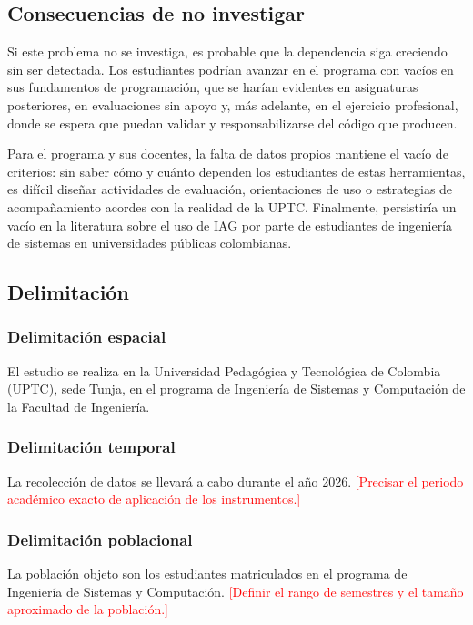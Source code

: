 \documentclass[12pt,letterpaper]{article}
\newcommand{\pendiente}[1]{\textcolor{red}{[#1]}}
\begin{document}
\subsection{Consecuencias de no investigar}

Si este problema no se investiga, es probable que la dependencia siga creciendo sin ser detectada. Los estudiantes podrían avanzar en el programa con vacíos en sus fundamentos de programación, que se harían evidentes en asignaturas posteriores, en evaluaciones sin apoyo y, más adelante, en el ejercicio profesional, donde se espera que puedan validar y responsabilizarse del código que producen.

Para el programa y sus docentes, la falta de datos propios mantiene el vacío de criterios: sin saber cómo y cuánto dependen los estudiantes de estas herramientas, es difícil diseñar actividades de evaluación, orientaciones de uso o estrategias de acompañamiento acordes con la realidad de la UPTC. Finalmente, persistiría un vacío en la literatura sobre el uso de IAG por parte de estudiantes de ingeniería de sistemas en universidades públicas colombianas.

\subsection{Delimitación}

\subsubsection{Delimitación espacial}
El estudio se realiza en la Universidad Pedagógica y Tecnológica de Colombia (UPTC), sede Tunja, en el programa de Ingeniería de Sistemas y Computación de la Facultad de Ingeniería.

\subsubsection{Delimitación temporal}
La recolección de datos se llevará a cabo durante el año 2026. \pendiente{Precisar el periodo académico exacto de aplicación de los instrumentos.}

\subsubsection{Delimitación poblacional}
La población objeto son los estudiantes matriculados en el programa de Ingeniería de Sistemas y Computación. \pendiente{Definir el rango de semestres y el tamaño aproximado de la población.}
\end{document}
